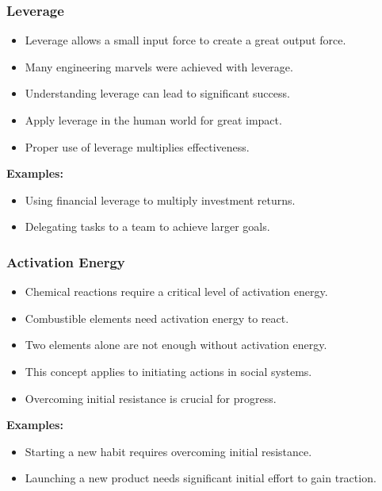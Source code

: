 \begin{frame}[fragile]\frametitle{Leverage}
\begin{itemize}
    \item Leverage allows a small input force to create a great output force.
    \item Many engineering marvels were achieved with leverage.
    \item Understanding leverage can lead to significant success.
    \item Apply leverage in the human world for great impact.
    \item Proper use of leverage multiplies effectiveness.
\end{itemize}
\textbf{Examples:}
\begin{itemize}
    \item Using financial leverage to multiply investment returns.
    \item Delegating tasks to a team to achieve larger goals.
\end{itemize}
\end{frame}

\begin{frame}[fragile]\frametitle{Activation Energy}
\begin{itemize}
    \item Chemical reactions require a critical level of activation energy.
    \item Combustible elements need activation energy to react.
    \item Two elements alone are not enough without activation energy.
    \item This concept applies to initiating actions in social systems.
    \item Overcoming initial resistance is crucial for progress.
\end{itemize}
\textbf{Examples:}
\begin{itemize}
    \item Starting a new habit requires overcoming initial resistance.
    \item Launching a new product needs significant initial effort to gain traction.
\end{itemize}
\end{frame}

